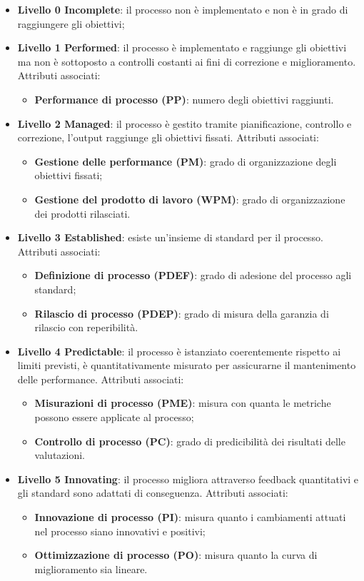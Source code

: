 \begin{itemize}
	\item \textbf{Livello 0 Incomplete}: il processo non è implementato e non è in grado di raggiungere gli obiettivi;
	\item \textbf{Livello 1 Performed}: il processo è implementato e raggiunge gli obiettivi ma non è sottoposto a controlli costanti ai fini di correzione e miglioramento.
	Attributi associati:
	\begin{itemize}
		\item \textbf{Performance di processo (PP)}: numero degli obiettivi raggiunti.
	\end{itemize}
	\item \textbf{Livello 2 Managed}: il processo è gestito tramite pianificazione, controllo e correzione, l'output raggiunge gli obiettivi fissati.
	Attributi associati:
	\begin{itemize}
		\item \textbf{Gestione delle performance (PM)}: grado di organizzazione degli obiettivi fissati;
		\item \textbf{Gestione del prodotto di lavoro (WPM)}: grado di organizzazione dei prodotti rilasciati.
	\end{itemize}
	\item \textbf{Livello 3 Established}: esiste un'insieme di standard per il processo.
	Attributi associati:
	\begin{itemize}
		\item \textbf{Definizione di processo (PDEF)}: grado di adesione del processo agli standard;
		\item \textbf{Rilascio di processo (PDEP)}: grado di misura della garanzia di rilascio con reperibilità.
	\end{itemize}
	\item \textbf{Livello 4 Predictable}: il processo è istanziato coerentemente rispetto ai limiti previsti, è quantitativamente misurato per assicurarne il mantenimento delle performance.
	Attributi associati:
	\begin{itemize}
		\item \textbf{Misurazioni di processo (PME)}: misura con quanta  le metriche possono essere applicate al processo;
		\item \textbf{Controllo di processo (PC)}: grado di predicibilità dei risultati delle valutazioni.
	\end{itemize}
	\item \textbf{Livello 5 Innovating}: il processo migliora attraverso feedback quantitativi e gli standard sono adattati di conseguenza.
	Attributi associati:
	\begin{itemize}
		\item \textbf{Innovazione di processo (PI)}: misura quanto i cambiamenti attuati nel processo siano innovativi e positivi;
		\item \textbf{Ottimizzazione di processo (PO)}: misura quanto la curva di miglioramento sia lineare.
	\end{itemize}
\end{itemize}

